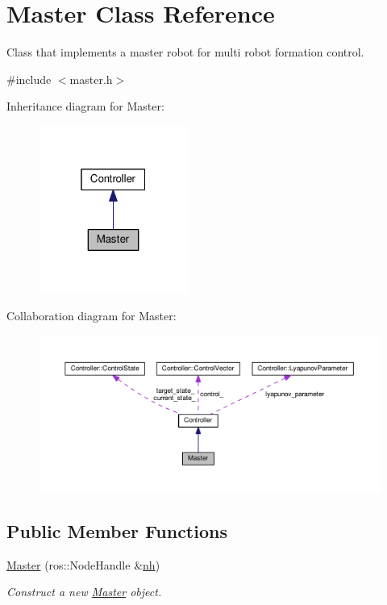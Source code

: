 \hypertarget{classMaster}{}\section{Master Class Reference}
\label{classMaster}


Class that implements a master robot for multi robot formation control.  




{\ttfamily \#include $<$master.\+h$>$}



Inheritance diagram for Master\+:\nopagebreak
\begin{figure}[H]
\begin{center}
\leavevmode
\includegraphics[width=139pt]{classMaster__inherit__graph}
\end{center}
\end{figure}


Collaboration diagram for Master\+:\nopagebreak
\begin{figure}[H]
\begin{center}
\leavevmode
\includegraphics[width=350pt]{classMaster__coll__graph}
\end{center}
\end{figure}
\subsection*{Public Member Functions}
\begin{DoxyCompactItemize}
\item 
\hyperlink{classMaster_ab52840de45f9ce7022c9cf58cfb49398}{Master} (ros\+::\+Node\+Handle \&\hyperlink{classController_a24e3d3c2536f6ed29018bad1fd53dae2}{nh})
\begin{DoxyCompactList}\small\item\em Construct a new \hyperlink{classMaster}{Master} object. \end{DoxyCompactList}\end{DoxyCompactItemize}
